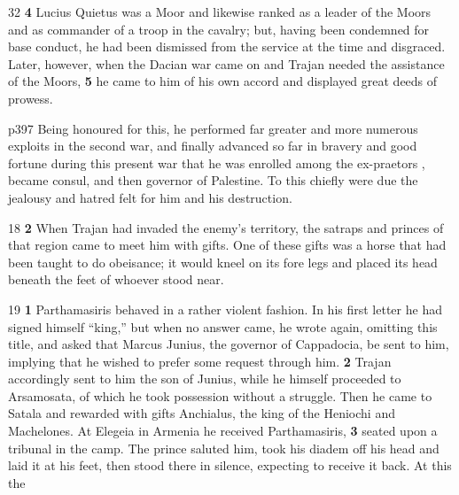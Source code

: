 32
\textbf{4} Lucius Quietus was a Moor and likewise ranked as a leader of the Moors and as commander of a troop in the cavalry; but, having been condemned for base conduct, he had been dismissed from the service at the time and disgraced. Later, however, when the Dacian war came on and Trajan needed the assistance of the Moors, \textbf{5} he came to him of his own accord and displayed great deeds of prowess.

p397 Being honoured for this, he performed far greater and more numerous exploits in the second war, and finally advanced so far in bravery and good fortune during this present war that he was enrolled among the ex-praetors , became consul, and then governor of Palestine. To this chiefly were due the jealousy and hatred felt for him and his destruction.

18
\textbf{2} When Trajan had invaded the enemy's territory, the satraps and princes of that region came to meet him with gifts. One of these gifts was a horse that had been taught to do obeisance; it would kneel on its fore legs and placed its head beneath the feet of whoever stood near.

19
\textbf{1} Parthamasiris behaved in a rather violent fashion. In his first letter he had signed himself ``king,'' but when no answer came, he wrote again, omitting this title, and asked that Marcus Junius, the governor of Cappadocia, be sent to him, implying that he wished to prefer some request through him. \textbf{2} Trajan accordingly sent to him the son of Junius, while he himself proceeded to Arsamosata, of which he took possession without a struggle. Then he came to Satala and rewarded with gifts Anchialus, the king of the Heniochi and Machelones. At Elegeia in Armenia he received Parthamasiris, \textbf{3} seated upon a tribunal in the camp. The prince saluted him, took his diadem off his head and laid it at his feet, then stood there in silence, expecting to receive it back. At this the


